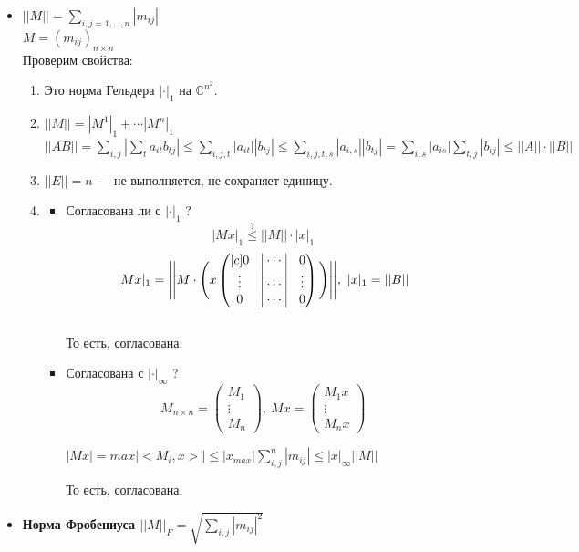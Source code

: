 \documentclass[12pt]{article}
\theoremstyle{definition}
\numberwithin{equation}{section}
\begin{document}
\begin{itemize}
\item \textbf{$||M||=\sum\limits_{i, j=1,...,n}|m_{ij}|$}\\
$M=(m_{ij})_{n\times n}$\\
Проверим свойства:\begin{enumerate}[start=0]
\item Это норма Гельдера $|\cdot |_1$ на $\mathbb{C}^{n^2}$.
\item $||M||=|M^1|_1+\cdots|M^n|_1$\\
    $||AB||=\sum\limits_{i,j}|\sum\limits_t a_{it}b_{tj}|\leqslant \sum\limits_{i,j,t}|a_{it}||b_{tj}|\leqslant \sum\limits_{i,j,t,s}|a_{i,s}||b_{tj}|=\sum\limits_{i,s}|a_{is}|\sum\limits_{t, j}|b_{tj}|\leqslant||A||\cdot||B||$
\item $||E||=n$ --- не выполняется, не сохраняет единицу.\\
\item \begin{itemize}
\item Согласована ли с $|\cdot|_1$ ?\\
    $$|Mx|_1 \overset{?}{\leqslant} ||M||\cdot |x|_1$$
    \[|Mx|_1 = \Bigg | \Bigg | M\cdot \Bigg( \bar x \begin{pmatrix}[c]
0 & \vline~ \cdots~ \vline& 0\\ 
\vdots & \vline~ \cdots ~\vline& \vdots\\
0 & \vline~ \cdots ~\vline& 0
\end{pmatrix}\Bigg) \Bigg | \Bigg |, ~ |x|_1 = ||B||\]\\
То есть, согласована.
\item Согласована с $|\cdot|_\infty$ ? 
\[M_{n \times n} = \begin{pmatrix}
M_1\\
\vdots\\
M_n
\end{pmatrix}, ~Mx=\begin{pmatrix}
M_1x\\
\vdots\\
M_nx
\end{pmatrix}\]\begin{center}
$|Mx|=max|<M_i, \bar x>| \leqslant |x_{max}|\sum\limits_{i,j}^n|m_{ij}|\leqslant |x|_{\infty}||M||$\end{center}
То есть, согласована.
\end{itemize}
\end{enumerate}
\item \textbf{Норма Фробениуса $||M||_F=\sqrt{\sum\limits_{i,j}|m_{ij}|^2}$}\\

\end{itemize}
\end{document}
